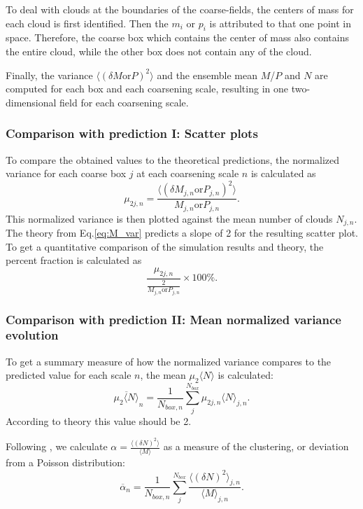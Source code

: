 \documentclass[a4paper, 12pt, draft]{article}
\begin{document}
To deal with clouds at the boundaries of the coarse-fields, the centers of mass for each cloud is first identified. Then the $m_i$ or $p_i$ is attributed to that one point in space. Therefore, the coarse box which contains the center of mass also contains the entire cloud, while the other box does not contain any of the cloud. 

Finally, the variance $\langle (\delta M \mathrm{or} P)^2 \rangle$ and the ensemble mean $M$/$P$ and $N$ are computed for each box and each coarsening scale, resulting in one two-dimensional field for each coarsening scale. 

\subsubsection{Comparison with prediction I: Scatter plots}
To compare the obtained values to the theoretical predictions, the normalized variance for each coarse box $j$ at each coarsening scale $n$ is calculated as 
\begin{equation} \label{eq:normalized_variance}
 \mu_{2 j, n} = \frac{\langle (\delta M_{j,n} \mathrm{ or } P_{j,n})^2 \rangle}{M_{j,n} \mathrm{ or } P_{j,n}}.
\end{equation}
This normalized variance is then plotted against the mean number of clouds $N_{j,n}$. The theory from Eq.\ref{eq:M_var} predicts a slope of 2 for the resulting scatter plot. To get a quantitative comparison of the simulation results and theory, the percent fraction is calculated as
\begin{equation} \label{eq:normalized_variance_percent}
 \frac{\mu_{2 j, n}}{\frac{2}{M_{j,n} \mathrm{ or } P_{j,n}}}\times 100\%.
\end{equation}

\subsubsection{Comparison with prediction II: Mean normalized variance evolution}
To get a summary measure of how the normalized variance compares to the predicted value for each scale $n$, the mean $\mu_{2} \langle N \rangle$ is calculated:
\begin{equation} \label{eq:mean_nvar_n}
 \overline{\mu_{2}\langle N \rangle}_n = \frac{1}{N_{box, n}} \sum_{j}^{N_{box}} \mu_{2 j,n}\langle N \rangle_{j,n}.
\end{equation}
According to theory this value should be 2. 

Following \cite{Davoudi2010}, we calculate $\alpha = \frac{\langle (\delta N)^2 \rangle}{\langle M \rangle}$ as a measure of the clustering, or deviation from a Poisson distribution:
\begin{equation} \label{eq:mean_alpha}
 \overline{\alpha}_n = \frac{1}{N_{box, n}} \sum_{j}^{N_{box}} \frac{\langle (\delta N)^2 \rangle_{j,n}}{\langle M \rangle_{j,n}}.
\end{equation}
\end{document}
